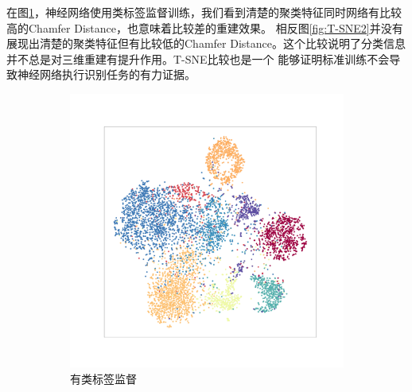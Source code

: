 \documentclass[bachelor, nocolorlinks, printoneside]{seuthesis} %
\begin{document}
\begin{Main}
\begin{enumerate}
    在图\ref{fig:T-SNE1}，神经网络使用类标签监督训练，我们看到清楚的聚类特征同时网络有比较高的Chamfer Distance，也意味着比较差的重建效果。
    相反图\ref{fig:T-SNE2}并没有展现出清楚的聚类特征但有比较低的Chamfer Distance。这个比较说明了分类信息并不总是对三维重建有提升作用。T-SNE比较也是一个
    能够证明标准训练不会导致神经网络执行识别任务的有力证据。
\end{enumerate}

\begin{figure}
	\begin{subfigure}[t]{0.3\linewidth} \centering 
     \includegraphics[width=\columnwidth]{figs/T-SNE-class.png}
     \caption{有类标签监督}\label{fig:T-SNE1}
   \end{subfigure}
   \begin{subfigure}[t]{0.3\linewidth} \centering

\end{subfigure}
\end{figure}
\end{Main}
\end{document}
